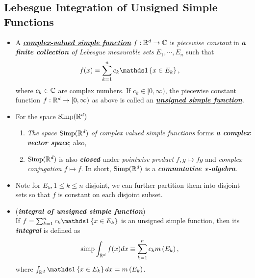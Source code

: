 \documentclass[11pt]{article}
\begin{document}
\subsection{Lebesgue Integration of Unsigned Simple Functions}
\begin{itemize}
\item  \begin{definition}
A \emph{\underline{\textbf{complex-valued simple function}}} $f: {\mathbb R}^{d} \rightarrow {\mathbb C}$ is \emph{piecewise constant} in \emph{\textbf{a finite collection} of Lebesgue measurable sets} $E_{1},\cdots, E_{n}$ such that 
\begin{align*}
f(x)&= \sum_{k=1}^{n}c_{k}\ind{x\in E_{k}},
\end{align*}
where $c_{k}\in {\mathbb C}$ are complex numbers. If $c_{k}\in [0,\infty)$, the piecewise constant function $f: {\mathbb R}^{d} \rightarrow [0,\infty)$ as above is called  an \underline{\emph{\textbf{unsigned simple function}}}.
\end{definition}

\item \begin{remark} For the space  $\text{Simp}({\mathbb R}^d)$
\begin{enumerate}
\item \emph{The space $\text{Simp}({\mathbb R}^d)$ of complex valued simple functions} forms \emph{\textbf{a complex vector space}}; also, 
\item $\text{Simp}({\mathbb R}^d)$ is also \emph{\textbf{closed}} under \emph{pointwise product} $f, g \mapsto fg$ and \emph{complex conjugation} $f \mapsto \bar{f}$. In short, $\text{Simp}({\mathbb R}^d)$ is a \emph{\textbf{commutative ∗-algebra}}. 
\end{enumerate}
\end{remark}

\item \begin{remark}
Note for $E_{k}, 1\le k\le n$ disjoint, we can further partition them into disjoint sets so that $f$ is constant on each disjoint subset. 
\end{remark}

\item \begin{definition} (\emph{\textbf{integral of unsigned simple function}})\\
If $f= \sum_{k=1}^{n}c_{k}\ind{x\in E_{k}}$ is an unsigned simple function, then its \emph{\textbf{integral}} is defined as 
\begin{align*}
\text{simp} \int_{{\mathbb R}^{d}} f(x) dx&\equiv \sum_{k=1}^{n}c_{k}m\left(E_{k}\right),
\end{align*}
where $\int_{\bR^{d}} \ind{x\in E_{k}} dx  = m\paren{E_{k}}$.
\end{definition}


\end{itemize}
\end{document}

